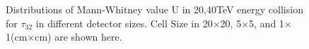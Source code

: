 \documentclass[final,1p,11pt]{elsarticle}
\begin{document}
\begin{figure}
\begin{center}
{   }

\end{center}
\caption{Distributions of Mann-Whitney value U in 20,40TeV energy collision for $\tau_{32}$ in different detector sizes. Cell Size in 20$\times$20, 5$\times$5, and 1$\times$1(cm$\times$cm) are shown here.}
\label{fig:cluster_tau21_tau32}
\end{figure}
\end{document}

